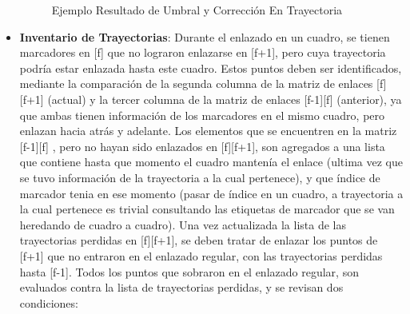 \begin{itemize}
\begin{figure}[H]
 \centering
 \caption{Ejemplo Resultado de Umbral y Corrección En Trayectoria}
\label{distro_acc_track_m13_fix}
\end{figure}
\item \textbf{Inventario de Trayectorias}: Durante el enlazado en un cuadro, se tienen marcadores en [f] que no lograron enlazarse en [f+1], pero cuya trayectoria podría estar enlazada hasta este cuadro.
Estos puntos deben ser identificados, mediante la comparación de la segunda columna de la matriz de enlaces [f][f+1] (actual) y la tercer columna de la matriz de enlaces [f-1][f] (anterior), ya que ambas tienen información de los marcadores en el mismo cuadro, pero enlazan hacia atrás y adelante.
Los elementos que se encuentren en la matriz [f-1][f] , pero no hayan sido enlazados en [f][f+1], son agregados a una lista que  contiene hasta que momento el cuadro mantenía el enlace (ultima vez que se tuvo información de la trayectoria a la cual pertenece), y que índice de marcador tenia en ese momento (pasar de índice en un cuadro, a trayectoria a la cual pertenece es trivial consultando las etiquetas de marcador que se van heredando de cuadro a cuadro).
Una vez actualizada la lista de las trayectorias perdidas en [f][f+1], se deben tratar de enlazar los puntos de [f+1] que no entraron en el enlazado regular, con las trayectorias perdidas hasta [f-1]. Todos los puntos que sobraron en el enlazado regular, son evaluados contra la lista de trayectorias perdidas, y se revisan dos condiciones:


\end{itemize}
